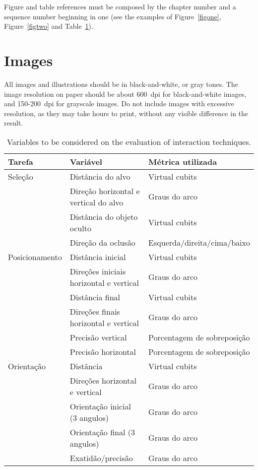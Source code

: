 \documentclass{SBCbookchapter}
\begin{document}
Figure and table references must be composed by the chapter number and
a sequence number beginning in one (see the examples of
Figure~\ref{figone}, Figure~\ref{figtwo} and Table~\ref{tabone}).

\section{Images}
All images and illustrations should be in black-and-white, or gray
tones. The image resolution on paper should be about 600~dpi for
black-and-white images, and 150-200~dpi for grayscale images.  Do not
include images with excessive resolution, as they may take hours to
print, without any visible difference in the result.

\begin{table}[h!]
	\caption{Variables to be considered on the evaluation of
		interaction techniques.}
	\label{tabone}
	\begin{footnotesize}
	\begin{tabular}{|p{40mm}|p{55mm}|p{42mm}|}
	\hline
	\hspace*{\fill}\textbf{Tarefa}\hspace*{\fill} &
	\hspace*{\fill}\textbf{Variável}\hspace*{\fill} & 
	\hspace*{\fill}\textbf{Métrica utilizada}\hspace*{\fill}\\
	\hline
	Seleção &
	Distância do alvo &
	Virtual cubits \\ \cline{2-3}
	& Direção horizontal e vertical do alvo &
	Graus do arco \\ \cline{2-3}
	& Distância do objeto oculto &
	Virtual cubits \\ \cline{2-3}
	& Direção da oclusão &
	Esquerda/direita/cima/baixo \\
	\hline
	Posicionamento &
	Distância inicial &
	Virtual cubits \\ \cline{2-3}
	& Direções iniciais horizontal e vertical &
	Graus do arco \\ \cline{2-3}
	& Distância final &
	Virtual cubits \\ \cline{2-3}
	& Direções finais horizontal e vertical &
	Graus do arco \\ \cline{2-3}
	& Precisão vertical &
	Porcentagem de sobreposição \\ \cline{2-3}
	& Precisão horizontal &
	Porcentagem de sobreposição \\
	\hline
	Orientação &
	Distância &
	Virtual cubits \\ \cline{2-3}
	& Direções horizontal e vertical &
	Graus do arco \\ \cline{2-3}
	& Orientação inicial (3 angulos) &
	Graus do arco \\ \cline{2-3}
	& Orientação final (3 angulos) &
	Graus do arco \\ \cline{2-3}
	& Exatidão/precisão &
	Graus do arco \\
	\hline
	\end{tabular}
	\end{footnotesize}
\end{table}



\end{document}
